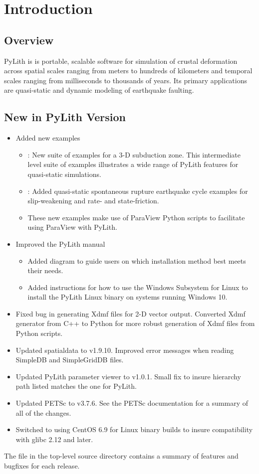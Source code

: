 
\chapter{Introduction}


\section{Overview}

PyLith is is portable, scalable software for simulation of crustal
deformation across spatial scales ranging from meters to hundreds of
kilometers and temporal scales ranging from milliseconds to thousands
of years. Its primary applications are quasi-static and dynamic
modeling of earthquake faulting.

\section{New in PyLith Version \pylithVersionNumber}
\begin{itemize}
\item Added new examples
  \begin{itemize}
  \item {}: New suite of examples for a 3-D
    subduction zone. This intermediate level suite of examples
    illustrates a wide range of PyLith features for quasi-static simulations.
  \item {}: Added quasi-static spontaneous rupture
    earthquake cycle examples for slip-weakening and rate- and
    state-friction.
  \item These new examples make use of ParaView Python scripts to
    facilitate using ParaView with PyLith.
  \end{itemize}
\item Improved the PyLith manual
  \begin{itemize}
  \item Added diagram to guide users on which installation method best
    meets their needs.
  \item Added instructions for how to use the Windows Subsystem for
    Linux to install the PyLith Linux binary on systems running
    Windows 10.
  \end{itemize}
\item Fixed bug in generating Xdmf files for 2-D vector
  output. Converted Xdmf generator from C++ to Python for more robust
  generation of Xdmf files from Python scripts.
\item Updated spatialdata to v1.9.10. Improved error messages when
  reading SimpleDB and SimpleGridDB files.
\item Updated PyLith parameter viewer to v1.0.1. Small fix to insure
  hierarchy path listed matches the one for PyLith.
\item Updated PETSc to v3.7.6. See the PETSc documentation for a
  summary of all of the changes.
\item Switched to using CentOS 6.9 for Linux binary builds to insure
  compatibility with glibc 2.12 and later.
\end{itemize}
The  file in the top-level source directory contains
a summary of features and bugfixes for each release.


